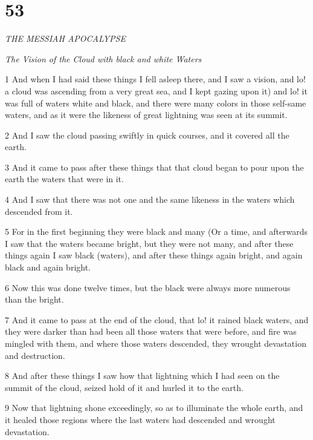 \chapter{53}

\par \textit{THE MESSIAH APOCALYPSE}

\par \textit{The Vision of the Cloud with black and white Waters}


\par 1 And when I had said these things I fell asleep there, and I saw a vision, and lo! a cloud was ascending from a very great sea, and I kept gazing upon it) and lo! it was full of waters white and black, and there were many colors in those self-same waters, and as it were the likeness of great lightning was seen at its summit. 

\par 2 And I saw the cloud passing swiftly in quick courses, and it covered all the earth. 

\par 3 And it came to pass after these things that that cloud began to pour upon the earth the waters that were in it. 

\par 4 And I saw that there was not one and the same like­ness in the waters which descended from it. 

\par 5 For in the first beginning they were black and many (Or a time, and afterwards I saw that the waters became bright, but they were not many, and after these things again I saw black (waters), and after these things again bright, and again black and again bright. 

\par 6 Now this was done twelve times, but the black were always more numerous than the bright. 

\par 7 And it came to pass at the end of the cloud, that lo! it rained black waters, and they were darker than had been all those waters that were before, and fire was mingled with them, and where those waters descended, they wrought devastation and destruction. 

\par 8 And after these things I saw how that lightning which I had seen on the summit of the cloud, seized hold of it and hurled it to the earth. 

\par 9 Now that lightning shone exceedingly, so as to illuminate the whole earth, and it healed those regions where the last waters had descended and wrought devastation. 

